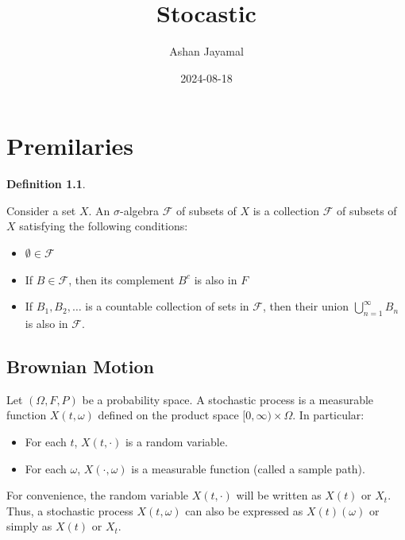 \documentclass[
]{book}
\title{Stocastic}
\author{Ashan Jayamal}
\date{2024-08-18}
\providecommand{\tightlist}{%
  \setlength{\itemsep}{0pt}\setlength{\parskip}{0pt}}
\theoremstyle{definition}
\newtheorem{definition}{Definition}[chapter]
\theoremstyle{definition}
\theoremstyle{definition}
\theoremstyle{definition}
\theoremstyle{remark}
\begin{document}
\maketitle

{
\setcounter{tocdepth}{1}
\tableofcontents
}
\chapter{Premilaries}\label{premilaries}

\begin{definition}
\protect\hypertarget{def:unnamed-chunk-1}{}\label{def:unnamed-chunk-1}

Consider a set \(X\).
An \(\sigma\)-algebra \(\mathcal{F}\) of subsets of \(X\) is a collection \(\mathcal{F}\) of subsets of \(X\) satisfying the following conditions:

\begin{itemize}
\tightlist
\item
  \(\emptyset \in \mathcal{F}\)
\item
  If \(B \in \mathcal{F}\), then its complement \(B^c\) is also in \(F\)
\item
  If \(B_1, B_2, \ldots\) is a countable collection of sets in \(\mathcal{F}\), then their union \(\bigcup_{n=1}^\infty B_n\) is also in \(\mathcal{F}\).
\end{itemize}

\end{definition}

\section{Brownian Motion}\label{brownian-motion}

Let \((\Omega, F, P)\) be a probability space. A stochastic process is a measurable function \(X(t, \omega)\) defined on the product space \([0,\infty) \times \Omega\). In particular:

\begin{itemize}
\tightlist
\item
  For each \(t\), \(X(t, \cdot)\) is a random variable.
\item
  For each \(\omega\), \(X(\cdot, \omega)\) is a measurable function (called a sample path).
\end{itemize}

For convenience, the random variable \(X(t, \cdot)\) will be written as \(X(t)\) or \(X_t\).
Thus, a stochastic process \(X(t, \omega)\) can also be expressed as \(X(t)(\omega)\) or simply as \(X(t)\) or \(X_t\).
\end{document}
